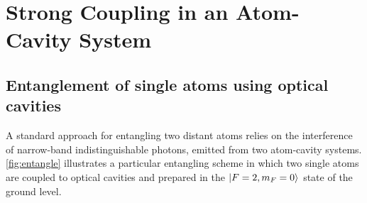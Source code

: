 \documentclass[../Thesis-IJspeert.tex]{subfiles}
\begin{document}
\graphicspath{ {"Strong Coupling in an Atom-Cavity System/figs/"} }

\chapter{Strong Coupling in an Atom-Cavity System}
\label{chap:StrongCouplinginanAtom-CavitySystem}

\section{Entanglement of single atoms using optical cavities}
A standard approach for entangling two distant atoms relies on the interference of narrow-band indistinguishable photons, emitted from two atom-cavity systems. \autoref{fig:entangle} illustrates a particular entangling scheme in which two single  atoms are coupled to optical cavities and prepared in the $\ket{F=2,m_F=0}$ state of the  ground level.
\end{document}
